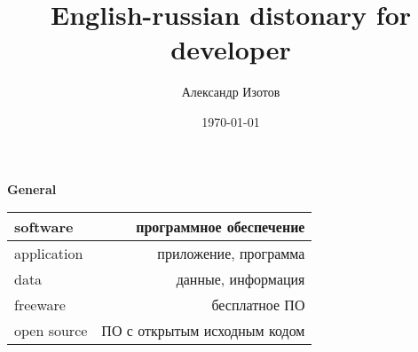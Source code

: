 \documentclass[a4paper,16pt]{article} %
\title{English-russian distonary for developer}
\date{\today} %
\author{Александр Изотов}
\begin{document}
	\begin{center}
		\textbf{General}
	\end{center}
	\begin{tabular}{ | l | r |}
		\raggedright
		software & программное обеспечение \\ \hline
		application & приложение, программа \\ \hline
		data & данные, информация \\ \hline
		freeware & бесплатное ПО \\ \hline
		open source & ПО с открытым исходным кодом \\
	\end{tabular}
\end{document}
